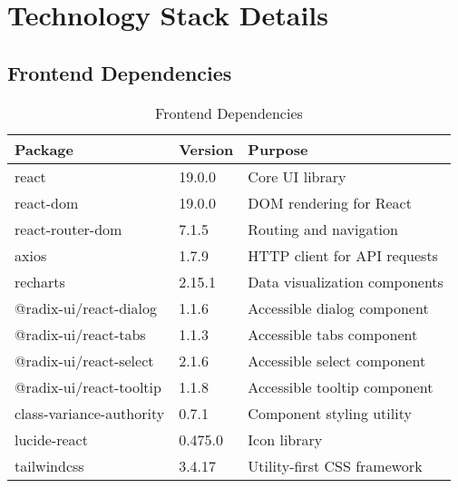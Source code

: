 \documentclass[12pt,a4paper]{article}
\begin{document}
\section{Technology Stack Details}\label{appendix:tech}

\subsection{Frontend Dependencies}
\begin{table}[H]
\centering
\begin{tabular}{|p{4cm}|p{2cm}|p{8cm}|}
\hline
\textbf{Package} & \textbf{Version} & \textbf{Purpose} \\
\hline
react & 19.0.0 & Core UI library \\
\hline
react-dom & 19.0.0 & DOM rendering for React \\
\hline
react-router-dom & 7.1.5 & Routing and navigation \\
\hline
axios & 1.7.9 & HTTP client for API requests \\
\hline
recharts & 2.15.1 & Data visualization components \\
\hline
@radix-ui/react-dialog & 1.1.6 & Accessible dialog component \\
\hline
@radix-ui/react-tabs & 1.1.3 & Accessible tabs component \\
\hline
@radix-ui/react-select & 2.1.6 & Accessible select component \\
\hline
@radix-ui/react-tooltip & 1.1.8 & Accessible tooltip component \\
\hline
class-variance-authority & 0.7.1 & Component styling utility \\
\hline
lucide-react & 0.475.0 & Icon library \\
\hline
tailwindcss & 3.4.17 & Utility-first CSS framework \\
\hline
\end{tabular}
\caption{Frontend Dependencies}
\end{table}
\end{document}
